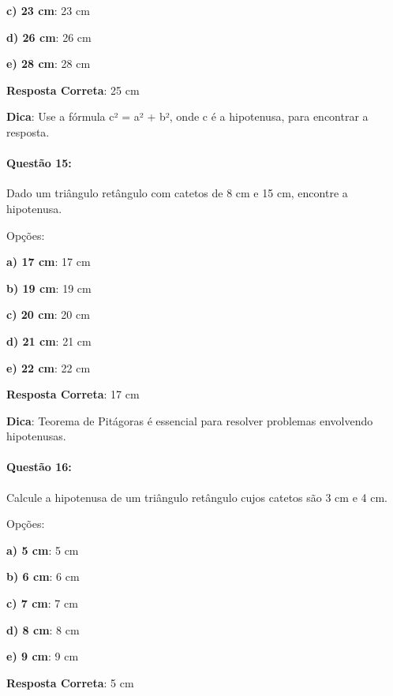 \documentclass{article}
\begin{document}
\textbf{c) 23 cm}: 23 cm 

\textbf{d) 26 cm}: 26 cm 

\textbf{e) 28 cm}: 28 cm 

\vspace{\baselineskip}\textbf{Resposta Correta}: 25 cm

\vspace{\baselineskip}\textbf{Dica}: Use a fórmula c² = a² + b², onde c é a hipotenusa, para encontrar a resposta.

\paragraph{Questão 15:}
{Dado um triângulo retângulo com catetos de 8 cm e 15 cm, encontre a hipotenusa.}

\vspace{\baselineskip}Opções:

\vspace{\baselineskip}\textbf{a) 17 cm}: 17 cm 

\textbf{b) 19 cm}: 19 cm 

\textbf{c) 20 cm}: 20 cm 

\textbf{d) 21 cm}: 21 cm 

\textbf{e) 22 cm}: 22 cm 

\vspace{\baselineskip}\textbf{Resposta Correta}: 17 cm

\vspace{\baselineskip}\textbf{Dica}: Teorema de Pitágoras é essencial para resolver problemas envolvendo hipotenusas.

\paragraph{Questão 16:}
{Calcule a hipotenusa de um triângulo retângulo cujos catetos são 3 cm e 4 cm.}

\vspace{\baselineskip}Opções:

\vspace{\baselineskip}\textbf{a) 5 cm}: 5 cm 

\textbf{b) 6 cm}: 6 cm 

\textbf{c) 7 cm}: 7 cm 

\textbf{d) 8 cm}: 8 cm 

\textbf{e) 9 cm}: 9 cm 

\vspace{\baselineskip}\textbf{Resposta Correta}: 5 cm
\end{document}
